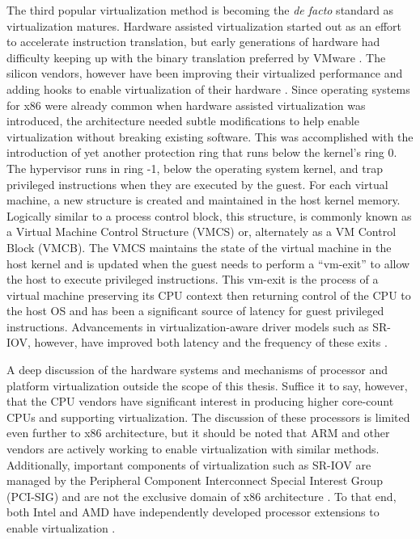 The third popular virtualization method is becoming the \emph{de facto} standard as virtualization matures.
Hardware assisted virtualization started out as an effort to accelerate instruction translation, but early generations of hardware had difficulty keeping up with the binary translation preferred by VMware \autocite{vmwareVT}.
The silicon vendors, however have been improving their virtualized performance and adding hooks to enable virtualization of their hardware \autocite{_grinberg_1}.
Since operating systems for x86 were already common when hardware assisted virtualization was introduced, the architecture needed subtle modifications to help enable virtualization without breaking existing software.  
This was accomplished with the introduction of yet another protection ring that runs below the kernel's ring 0.  
The hypervisor runs in ring -1, below the operating system kernel, and trap privileged instructions when they are executed by the guest.
For each virtual machine, a new structure is created and maintained in the host kernel memory.  
Logically similar to a process control block, this structure, is commonly known as a Virtual Machine Control Structure (VMCS) or, alternately as a VM Control Block (VMCB). 
The VMCS maintains the state of the virtual machine in the host kernel and is updated when the guest needs to perform a ``vm-exit'' to allow the host to execute privileged instructions.
This vm-exit is the process of a virtual machine preserving its CPU context then returning control of the CPU to the host OS and has been a significant source of latency for guest privileged instructions.
Advancements in virtualization-aware driver models such as SR-IOV, however, have improved both latency and the frequency of these exits \autocite{_nasa_1, _pcisig_1}.

A deep discussion of the hardware systems and mechanisms of processor and platform virtualization outside the scope of this thesis.
Suffice it to say, however, that the CPU vendors have significant interest in producing higher core-count CPUs and supporting virtualization.
The discussion of these processors is limited even further to x86 architecture, but it should be noted that ARM and other vendors are actively working to enable virtualization with similar methods.
Additionally, important components of virtualization such as SR-IOV are managed by the Peripheral Component Interconnect Special Interest Group (PCI-SIG) and are not the exclusive domain of x86 architecture \autocite{_pcisig_1}.
To that end, both Intel and AMD have independently developed processor extensions to enable virtualization \autocite{_grinberg_1}.

